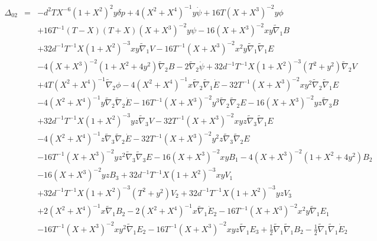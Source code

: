 \documentclass[10pt,letterpaper]{article}
\numberwithin{equation}{section}
\begin{document}
\begin{appendices}
\begin{eqnarray}
\\  \nonumber\\ 
\Delta_{02}&=& - d^2 T X^{-6} (1 + X^2)^2 y \delta p + 4 (X^2 + X^4)^{-1} y \dot{\psi} + 16 T (X + X^3)^{-2} y \phi \nonumber \\ 
&& + 16 T^{-1} (T -  X) (T + X) (X + X^3)^{-2} y \psi - 16 (X + X^3)^{-2} x y \tilde{\nabla}_{1}B \nonumber \\ 
&& + 32 d^{-1} T^{-1} X (1 + X^2)^{-3} x y \tilde{\nabla}_{1}V - 16 T^{-1} (X + X^3)^{-2} x^2 y \tilde{\nabla}_{1}\tilde{\nabla}_{1}E \nonumber \\ 
&& - 4 (X + X^3)^{-2} (1 + X^2 + 4 y^2) \tilde{\nabla}_{2}B - 2 \tilde{\nabla}_{2}\dot{\psi} + 32 d^{-1} T^{-1} X (1 + X^2)^{-3} (T^2 + y^2) \tilde{\nabla}_{2}V \nonumber \\ 
&& + 4 T (X^2 + X^4)^{-1} \tilde{\nabla}_{2}\phi - 4 (X^2 + X^4)^{-1} x \tilde{\nabla}_{2}\tilde{\nabla}_{1}\dot{E} - 32 T^{-1} (X + X^3)^{-2} x y^2 \tilde{\nabla}_{2}\tilde{\nabla}_{1}E \nonumber \\ 
&& - 4 (X^2 + X^4)^{-1} y \tilde{\nabla}_{2}\tilde{\nabla}_{2}\dot{E} - 16 T^{-1} (X + X^3)^{-2} y^3 \tilde{\nabla}_{2}\tilde{\nabla}_{2}E - 16 (X + X^3)^{-2} y z \tilde{\nabla}_{3}B \nonumber \\ 
&& + 32 d^{-1} T^{-1} X (1 + X^2)^{-3} y z \tilde{\nabla}_{3}V - 32 T^{-1} (X + X^3)^{-2} x y z \tilde{\nabla}_{3}\tilde{\nabla}_{1}E \nonumber \\ 
&& - 4 (X^2 + X^4)^{-1} z \tilde{\nabla}_{3}\tilde{\nabla}_{2}\dot{E} - 32 T^{-1} (X + X^3)^{-2} y^2 z \tilde{\nabla}_{3}\tilde{\nabla}_{2}E \nonumber \\ 
&& - 16 T^{-1} (X + X^3)^{-2} y z^2 \tilde{\nabla}_{3}\tilde{\nabla}_{3}E-16 (X + X^3)^{-2} x y B_{1} - 4 (X + X^3)^{-2} (1 + X^2 + 4 y^2) B_{2} \nonumber \\ 
&& - 16 (X + X^3)^{-2} y z B_{3} + 32 d^{-1} T^{-1} X (1 + X^2)^{-3} x y V_{1} \nonumber \\ 
&& + 32 d^{-1} T^{-1} X (1 + X^2)^{-3} (T^2 + y^2) V_{2} + 32 d^{-1} T^{-1} X (1 + X^2)^{-3} y z V_{3} \nonumber \\ 
&& + 2 (X^2 + X^4)^{-1} x \tilde{\nabla}_{1}B_{2} - 2 (X^2 + X^4)^{-1} x \tilde{\nabla}_{1}\dot{E}_{2} - 16 T^{-1} (X + X^3)^{-2} x^2 y \tilde{\nabla}_{1}E_{1} \nonumber \\ 
&& - 16 T^{-1} (X + X^3)^{-2} x y^2 \tilde{\nabla}_{1}E_{2} - 16 T^{-1} (X + X^3)^{-2} x y z \tilde{\nabla}_{1}E_{3} + \tfrac{1}{2} \tilde{\nabla}_{1}\tilde{\nabla}_{1}B_{2} -  \tfrac{1}{2} \tilde{\nabla}_{1}\tilde{\nabla}_{1}\dot{E}_{2} \nonumber \\ 

\end{eqnarray}
\end{appendices}
\end{document}
